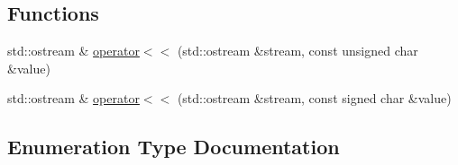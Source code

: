 \subsection*{Functions}
\begin{DoxyCompactItemize}
\item 
std\+::ostream \& \hyperlink{namespaceuva_1_1utils_1_1logging_ad1377b19aa409e93a549c8ed70bc3884}{operator$<$$<$} (std\+::ostream \&stream, const unsigned char \&value)
\item 
std\+::ostream \& \hyperlink{namespaceuva_1_1utils_1_1logging_a474ae73eb584975dd16f1e11df47d84a}{operator$<$$<$} (std\+::ostream \&stream, const signed char \&value)
\end{DoxyCompactItemize}


\subsection{Enumeration Type Documentation}
\hypertarget{namespaceuva_1_1utils_1_1logging_afe529dbf8d7fef2c75698798ec3e65e7}{}
